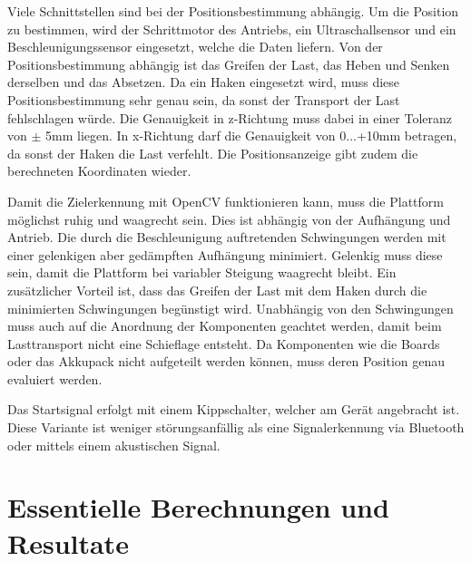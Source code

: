 \documentclass[a4paper]{report}
\begin{document}
Viele Schnittstellen sind bei der Positionsbestimmung abhängig. Um die Position zu bestimmen, wird der Schrittmotor des Antriebs, ein Ultraschallsensor und ein Beschleunigungssensor eingesetzt, welche die Daten liefern. Von der Positionsbestimmung abhängig ist das Greifen der Last, das Heben und Senken derselben und das Absetzen. Da ein Haken eingesetzt wird, muss diese Positionsbestimmung sehr genau sein, da sonst der Transport der Last fehlschlagen würde. Die Genauigkeit in z-Richtung muss dabei in einer Toleranz von $\pm$ 5mm liegen. In x-Richtung darf die Genauigkeit von 0...+10mm betragen, da sonst der Haken die Last verfehlt. Die Positionsanzeige gibt zudem die berechneten Koordinaten wieder.

Damit die Zielerkennung mit OpenCV funktionieren kann, muss die Plattform möglichst ruhig und waagrecht sein. Dies ist abhängig von der Aufhängung und Antrieb. Die durch die Beschleunigung auftretenden Schwingungen werden mit einer gelenkigen aber gedämpften Aufhängung minimiert. Gelenkig muss diese sein, damit die Plattform bei variabler Steigung waagrecht bleibt. Ein zusätzlicher Vorteil ist, dass das Greifen der Last mit dem Haken durch die minimierten Schwingungen begünstigt wird. Unabhängig von den Schwingungen muss auch auf die Anordnung der Komponenten geachtet werden, damit beim Lasttransport nicht eine Schieflage entsteht. Da Komponenten wie die Boards oder das Akkupack nicht aufgeteilt werden können, muss deren Position genau evaluiert werden.

Das Startsignal erfolgt mit einem Kippschalter, welcher am Gerät angebracht ist. Diese Variante ist weniger störungsanfällig als eine Signalerkennung via Bluetooth oder mittels einem akustischen Signal.


\section{Essentielle Berechnungen und Resultate}
\label{sec:EssBerechnung}
\end{document}
